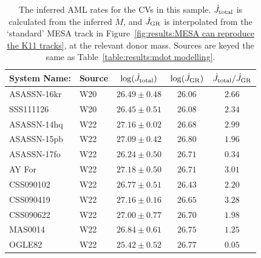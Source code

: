 \begin{table}
    \centering
    \caption{The inferred AML rates for the CVs in this sample. $\dot J_{\rm total}$ is calculated from the inferred $\dot M$, and $\dot J_{\rm GR}$ is interpolated from the `standard' MESA track in Figure~\ref{fig:results:MESA can reproduce the K11 tracks}, at the relevant donor mass. Sources are keyed the same as Table~\ref{table:results:mdot modelling}.}
    \label{table:results:Jdot results}
    \begin{tabular}{llccc}
        \hline
        {\bf System Name:} & \textbf{Source}  & \textbf{$\log(\dot J_{\rm total})$} & \textbf{$\log(\dot J_{\rm GR})$} & \textbf{$\dot J_{\rm total} / \dot J_{\rm GR}$} \\
        \hline \hline
        ASASSN-16kr      &  W20                 & $26.49 \pm 0.48$                  & $26.06$                          &  $2.66$ \\
        SSS111126        &  W20                 & $26.45 \pm 0.51$                  & $26.08$                          &  $2.34$ \\
        ASASSN-14hq      &  W22                 & $27.16 \pm 0.02$                  & $26.68$                          &  $2.99$ \\
        ASASSN-15pb      &  W22                 & $27.09 \pm 0.42$                  & $26.80$                          &  $1.96$ \\
        ASASSN-17fo      &  W22                 & $26.24 \pm 0.50$                  & $26.71$                          &  $0.34$ \\
        AY For           &  W22                 & $27.18 \pm 0.50$                  & $26.71$                          &  $3.01$ \\
        CSS090102        &  W22                 & $26.77 \pm 0.51$                  & $26.43$                          &  $2.20$ \\
        CSS090419        &  W22                 & $27.16 \pm 0.16$                  & $26.65$                          &  $3.28$ \\
        CSS090622        &  W22                 & $27.00 \pm 0.77$                  & $26.70$                          &  $1.98$ \\
        MAS0014          &  W22                 & $26.84 \pm 0.61$                  & $26.75$                          &  $1.25$ \\
        OGLE82           &  W22                 & $25.42 \pm 0.52$                  & $26.77$                          &  $0.05$ \\

\end{tabular}
\end{table}
